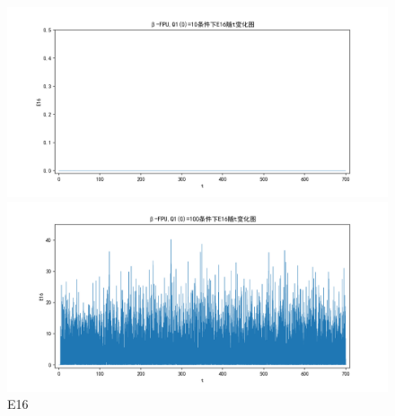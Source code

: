 \documentclass[10pt, a4paper]{article}
\begin{document}
    \begin{figure}[H]
        \begin{minipage}[t]{0.49\textwidth}
            \centering
            \includegraphics[width=\textwidth]{./q6_pics/cmp/E16.png}
        \end{minipage}
        \begin{minipage}[t]{0.49\textwidth}
            \centering
            \includegraphics[width=\textwidth]{./q6_pics/exp/E16.png}
        \end{minipage}
        \caption{E16}\label{fig:E16 in q6}
    \end{figure}
\end{document}

